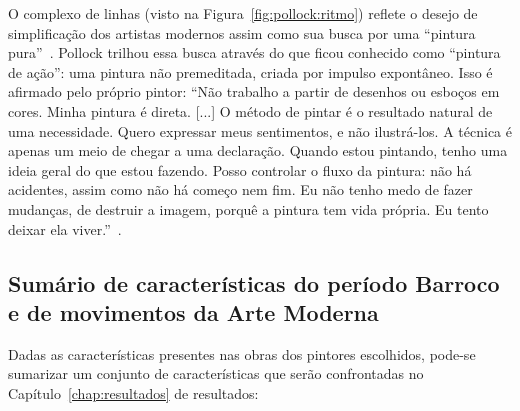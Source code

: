 O complexo de linhas (visto na Figura~\ref{fig:pollock:ritmo}) reflete
o desejo de simplificação dos artistas modernos assim como sua busca
por uma ``pintura pura''~\cite{gombrich}. Pollock trilhou essa busca
através do que ficou conhecido como ``pintura de ação'': uma pintura
não premeditada, criada por impulso expontâneo. Isso é afirmado pelo
próprio pintor: ``Não trabalho a partir de desenhos ou esboços em
cores. Minha pintura é direta. [...] O método de pintar é o resultado
natural de uma necessidade. Quero expressar meus sentimentos, e não
ilustrá-los. A técnica é apenas um meio de chegar a uma
declaração. Quando estou pintando, tenho uma ideia geral do que estou
fazendo. Posso controlar o fluxo da pintura: não há acidentes, assim
como não há começo nem fim. Eu não tenho medo de fazer mudanças, de
destruir a imagem, porquê a pintura tem vida própria. Eu tento deixar
ela viver.''~\cite{pollock}.

\subsection{Sumário de características do período Barroco e de movimentos da Arte Moderna}
\label{subsec:sumario}

Dadas as características presentes nas obras dos pintores escolhidos,
pode-se sumarizar um conjunto de características que serão
confrontadas no Capítulo~\ref{chap:resultados} de resultados:

